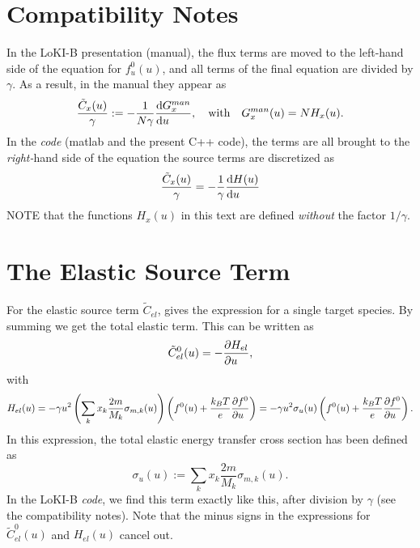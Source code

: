 \documentclass{book}
\begin{document}
\section{Compatibility Notes}
In the LoKI-B presentation (manual), the flux terms are moved to the left-hand side of the equation for $f^0_u(u)$,
and all terms of the final equation are divided by $\gamma$. As a result, in the manual they appear as
\begin{equation}
	\frac{\tilde{C}_x(u)}{\gamma} := -\frac{1}{N\gamma}\DERIV{G^{man}_x}{u}, \quad\text{with}\quad G^{man}_x(u)=N H_x(u).
	\label{eq:CvsGman}
\end{equation}
In the {\em code} (matlab and the present C++ code), the terms are all
brought to the {\em right-}hand side of the equation the source
terms are discretized as
\begin{equation}
	\frac{\tilde{C}_x(u)}{\gamma} = -\frac{1}{\gamma}\DERIV{H(u)}{u}
\end{equation}
NOTE that the functions $H_x(u)$ in this text are defined {\em without}
the factor $1/\gamma$.

\section{The Elastic Source Term}

For the elastic source term $\tilde{C}_{el}$, \cite[eq. 27]{Hagelaar2005} gives the
expression for a single target species. By
summing we get the total elastic term. This can be written as
\begin{equation}
	\tilde{C}^0_{el}(u)=-\PDEV{H_{el}}{u},
	\label{eq:Ctilde0-el}
\end{equation}
with
\begin{equation}
	H_{el}(u) = -\gamma u^2\left(\sum\limits_k x_k\frac{2m}{M_k}\sigma_{m,k}(u)\right)\left(f^0(u)+\frac{k_BT}{e}\PDEV{f^0}{u}\right)
	= -\gamma u^2\sigma_{u}(u)\left(f^0(u)+\frac{k_BT}{e}\PDEV{f^0}{u}\right).
\end{equation}
In this expression, the total elastic energy transfer cross section has been
defined as \cite[eq. 42]{Hagelaar2005}
\begin{equation}
	\sigma_{u}(u) := \sum\limits_k x_k\frac{2m}{M_k}\sigma_{m,k}(u).
\end{equation}
In the LoKI-B {\em code}, we find this term exactly like this, after division by $\gamma$ (see the
compatibility notes). Note that the minus signs in the expressions for $\tilde{C}^0_{el}(u)$
and $H_{el}(u)$ cancel out.
\end{document}
